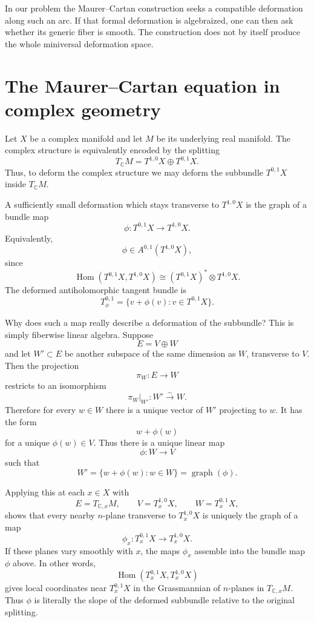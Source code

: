 In our problem the Maurer--Cartan
construction seeks a compatible deformation
along such an arc. If that formal deformation
is algebraized, one can then ask whether its
generic fiber is smooth. The construction
does not by itself produce the whole
miniversal deformation space.

\section{The Maurer--Cartan equation in complex geometry}
\label{section-maurer-cartan-complex-geometry}

\noindent
Let $X$ be a complex manifold and let $M$ be its
underlying real manifold. The complex structure is
equivalently encoded by the splitting
$$
T_{\mathbb C}M=T^{1,0}X\oplus T^{0,1}X.
$$
Thus, to deform the complex structure we may deform
the subbundle $T^{0,1}X$ inside $T_{\mathbb C}M$.

A sufficiently small deformation which stays transverse
to $T^{1,0}X$ is the graph of a bundle map
$$
\phi:T^{0,1}X\longrightarrow T^{1,0}X.
$$
Equivalently,
$$
\phi\in A^{0,1}(T^{1,0}X),
$$
since
$$
\operatorname{Hom}(T^{0,1}X,T^{1,0}X)
\cong (T^{0,1}X)^*\otimes T^{1,0}X.
$$
The deformed antiholomorphic tangent bundle is
$$
T^{0,1}_\phi
=\{v+\phi(v):v\in T^{0,1}X\}.
$$

Why does such a map really describe a deformation of the
subbundle? This is simply fiberwise linear algebra. Suppose
$$
E=V\oplus W
$$
and let $W'\subset E$ be another subspace of the same
dimension as $W$, transverse to $V$. Then the projection
$$
\pi_W:E\longrightarrow W
$$
restricts to an isomorphism
$$
\pi_W|_{W'}:W'\xrightarrow{\sim}W.
$$
Therefore for every $w\in W$ there is a unique vector of
$W'$ projecting to $w$. It has the form
$$
w+\phi(w)
$$
for a unique $\phi(w)\in V$. Thus there is a unique linear
map
$$
\phi:W\longrightarrow V
$$
such that
$$
W'=\{w+\phi(w):w\in W\}=\operatorname{graph}(\phi).
$$

Applying this at each $x\in X$ with
$$
E=T_{\mathbb C,x}M,\qquad
V=T^{1,0}_xX,\qquad
W=T^{0,1}_xX,
$$
shows that every nearby $n$-plane transverse to
$T^{1,0}_xX$ is uniquely the graph of a map
$$
\phi_x:T^{0,1}_xX\longrightarrow T^{1,0}_xX.
$$
If these planes vary smoothly with $x$, the maps $\phi_x$
assemble into the bundle map $\phi$ above. In other words,
$$
\operatorname{Hom}(T^{0,1}_xX,T^{1,0}_xX)
$$
gives local coordinates near $T^{0,1}_xX$ in the
Grassmannian of $n$-planes in $T_{\mathbb C,x}M$. Thus
$\phi$ is literally the slope of the deformed subbundle
relative to the original splitting.

